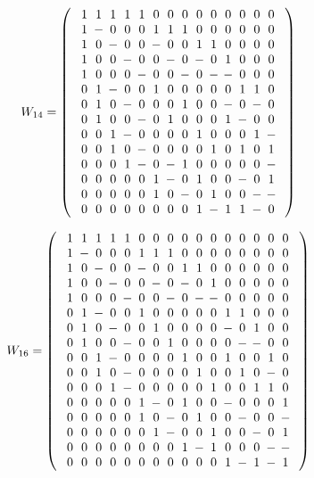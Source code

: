 $$W_{14} = 
\left(\begin{array}{c}
\Zp\Zp\Zp\Zp\Zp\Zz\Zz\Zz\Zz\Zz\Zz\Zz\Zz\Zz\\
\Zp\Zm\Zz\Zz\Zz\Zp\Zp\Zp\Zz\Zz\Zz\Zz\Zz\Zz\\
\Zp\Zz\Zm\Zz\Zz\Zm\Zz\Zz\Zp\Zp\Zz\Zz\Zz\Zz\\
\Zp\Zz\Zz\Zm\Zz\Zz\Zm\Zz\Zm\Zz\Zp\Zz\Zz\Zz\\
\Zp\Zz\Zz\Zz\Zm\Zz\Zz\Zm\Zz\Zm\Zm\Zz\Zz\Zz\\
\Zz\Zp\Zm\Zz\Zz\Zp\Zz\Zz\Zz\Zz\Zz\Zp\Zp\Zz\\
\Zz\Zp\Zz\Zm\Zz\Zz\Zz\Zp\Zz\Zz\Zm\Zz\Zm\Zz\\
\Zz\Zp\Zz\Zz\Zm\Zz\Zp\Zz\Zz\Zz\Zp\Zm\Zz\Zz\\
\Zz\Zz\Zp\Zm\Zz\Zz\Zz\Zz\Zp\Zz\Zz\Zz\Zp\Zm\\
\Zz\Zz\Zp\Zz\Zm\Zz\Zz\Zz\Zz\Zp\Zz\Zp\Zz\Zp\\
\Zz\Zz\Zz\Zp\Zm\Zz\Zm\Zp\Zz\Zz\Zz\Zz\Zz\Zm\\
\Zz\Zz\Zz\Zz\Zz\Zp\Zm\Zz\Zp\Zz\Zz\Zm\Zz\Zp\\
\Zz\Zz\Zz\Zz\Zz\Zp\Zz\Zm\Zz\Zp\Zz\Zz\Zm\Zm\\
\Zz\Zz\Zz\Zz\Zz\Zz\Zz\Zz\Zp\Zm\Zp\Zp\Zm\Zz
\end{array}\right)$$

$$W_{16} = 
\left(\begin{array}{c}
\Zp\Zp\Zp\Zp\Zp\Zz\Zz\Zz\Zz\Zz\Zz\Zz\Zz\Zz\Zz\Zz\\
\Zp\Zm\Zz\Zz\Zz\Zp\Zp\Zp\Zz\Zz\Zz\Zz\Zz\Zz\Zz\Zz\\
\Zp\Zz\Zm\Zz\Zz\Zm\Zz\Zz\Zp\Zp\Zz\Zz\Zz\Zz\Zz\Zz\\
\Zp\Zz\Zz\Zm\Zz\Zz\Zm\Zz\Zm\Zz\Zp\Zz\Zz\Zz\Zz\Zz\\
\Zp\Zz\Zz\Zz\Zm\Zz\Zz\Zm\Zz\Zm\Zm\Zz\Zz\Zz\Zz\Zz\\
\Zz\Zp\Zm\Zz\Zz\Zp\Zz\Zz\Zz\Zz\Zz\Zp\Zp\Zz\Zz\Zz\\
\Zz\Zp\Zz\Zm\Zz\Zz\Zp\Zz\Zz\Zz\Zz\Zm\Zz\Zp\Zz\Zz\\
\Zz\Zp\Zz\Zz\Zm\Zz\Zz\Zp\Zz\Zz\Zz\Zz\Zm\Zm\Zz\Zz\\
\Zz\Zz\Zp\Zm\Zz\Zz\Zz\Zz\Zp\Zz\Zz\Zp\Zz\Zz\Zp\Zz\\
\Zz\Zz\Zp\Zz\Zm\Zz\Zz\Zz\Zz\Zp\Zz\Zz\Zp\Zz\Zm\Zz\\
\Zz\Zz\Zz\Zp\Zm\Zz\Zz\Zz\Zz\Zz\Zp\Zz\Zz\Zp\Zp\Zz\\
\Zz\Zz\Zz\Zz\Zz\Zp\Zm\Zz\Zp\Zz\Zz\Zm\Zz\Zz\Zz\Zp\\
\Zz\Zz\Zz\Zz\Zz\Zp\Zz\Zm\Zz\Zp\Zz\Zz\Zm\Zz\Zz\Zm\\
\Zz\Zz\Zz\Zz\Zz\Zz\Zp\Zm\Zz\Zz\Zp\Zz\Zz\Zm\Zz\Zp\\
\Zz\Zz\Zz\Zz\Zz\Zz\Zz\Zz\Zp\Zm\Zp\Zz\Zz\Zz\Zm\Zm\\
\Zz\Zz\Zz\Zz\Zz\Zz\Zz\Zz\Zz\Zz\Zz\Zp\Zm\Zp\Zm\Zp
\end{array}\right)
$$

